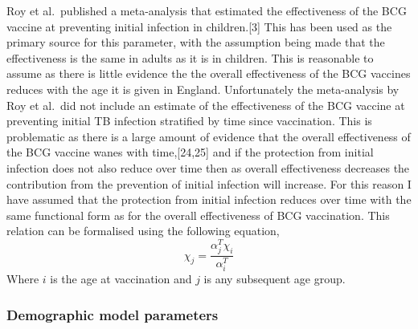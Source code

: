 \documentclass[11pt,twoside]{bristolthesis}
\begin{document}
  Roy et al.~published a meta-analysis that estimated the effectiveness of the BCG vaccine at preventing initial infection in children.{[}3{]} This has been used as the primary source for this parameter, with the assumption being made that the effectiveness is the same in adults as it is in children. This is reasonable to assume as there is little evidence the the overall effectiveness of the BCG vaccines reduces with the age it is given in England. Unfortunately the meta-analysis by Roy et al.~did not include an estimate of the effectiveness of the BCG vaccine at preventing initial TB infection stratified by time since vaccination. This is problematic as there is a large amount of evidence that the overall effectiveness of the BCG vaccine wanes with time,{[}24,25{]} and if the protection from initial infection does not also reduce over time then as overall effectiveness decreases the contribution from the prevention of initial infection will increase. For this reason I have assumed that the protection from initial infection reduces over time with the same functional form as for the overall effectiveness of BCG vaccination. This relation can be formalised using the following equation,
  \begin{equation}
    \chi_j = \frac{\alpha^T_j\chi_i}{\alpha^T_i}
    \label{eq:fun-prev-initial-inf}
  \end{equation}
  Where \(i\) is the age at vaccination and \(j\) is any subsequent age group.
  
  \hypertarget{demographic-model-parameters}{%
  \subsubsection{Demographic model parameters}\label{demographic-model-parameters}}
  
\end{document}
